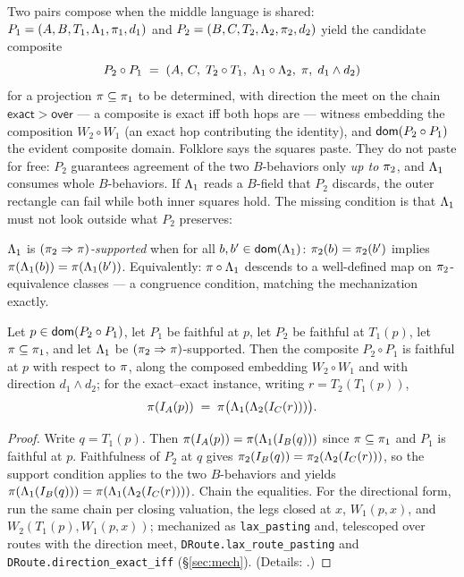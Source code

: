 Two pairs compose when the middle language is shared:
$P_1 = (A, B, T_1, \Lambda_1, \pi_1, d_1)$ and
$P_2 = (B, C, T_2, \Lambda_2, \pi_2, d_2)$ yield the candidate composite
\[
P_2 \circ P_1 \;=\; (A,\, C,\; T_2 \circ T_1,\; \Lambda_1 \circ \Lambda_2,\;
\pi,\; d_1 \wedge d_2)
\]
for a projection $\pi \subseteq \pi_1$ to be determined, with
direction the meet on the chain $\mathsf{exact} > \mathsf{over}$ --- a
composite is exact iff both hops are --- witness embedding the
composition $W_2 \circ W_1$ (an exact hop contributing the identity),
and $\mathsf{dom}(P_2 \circ P_1)$ the evident composite domain. Folklore says the
squares paste. They do not paste for free: $P_2$ guarantees agreement of
the two $B$-behaviors only \emph{up to} $\pi_2$, and $\Lambda_1$ consumes
whole $B$-behaviors. If $\Lambda_1$ reads a $B$-field that $P_2$ discards,
the outer rectangle can fail while both inner squares hold. The missing
condition is that $\Lambda_1$ must not look outside what $P_2$ preserves:

\begin{definition}[Support]
\label{def:support}
$\Lambda_1$ is \emph{$(\pi_2 \Rightarrow \pi)$-supported} when for all
$b, b' \in \mathsf{dom}(\Lambda_1)$:
$\pi_2(b) = \pi_2(b')$ implies
$\pi(\Lambda_1(b)) = \pi(\Lambda_1(b'))$.
Equivalently: $\pi \circ \Lambda_1$ descends to a well-defined map on
$\pi_2$-equivalence classes --- a congruence condition, matching the
mechanization exactly.
\end{definition}

\begin{theorem}[Pasting]
\label{thm:pasting}
Let $p \in \mathsf{dom}(P_2 \circ P_1)$, let $P_1$ be faithful at $p$, let $P_2$
be faithful at $T_1(p)$, let $\pi \subseteq \pi_1$, and let
$\Lambda_1$ be $(\pi_2 \Rightarrow \pi)$-supported. Then the
composite $P_2 \circ P_1$ is faithful at $p$ with respect to $\pi$,
along the composed embedding $W_2 \circ W_1$ and with direction
$d_1 \wedge d_2$; for the exact--exact instance, writing
$r = T_2(T_1(p))$,
\[
\pi(I_A(p)) \;=\; \pi\bigl(\Lambda_1(\Lambda_2(I_C(r)))\bigr).
\]
\end{theorem}

\begin{proof}
Write $q = T_1(p)$. Then $\pi(I_A(p)) = \pi(\Lambda_1(I_B(q)))$ since
$\pi \subseteq \pi_1$ and $P_1$ is faithful at $p$. Faithfulness of
$P_2$ at $q$ gives
$\pi_2(I_B(q)) = \pi_2(\Lambda_2(I_C(r)))$, so the
support condition applies to the two $B$-behaviors and yields
$\pi(\Lambda_1(I_B(q))) = \pi(\Lambda_1(\Lambda_2(I_C(r))))$.
Chain the equalities. For the directional form, run the same chain per
closing valuation, the legs closed at $x$, $W_1(p,x)$, and
$W_2(T_1(p), W_1(p,x))$; mechanized as \texttt{lax\_pasting} and,
telescoped over routes with the direction meet,
\texttt{DRoute.lax\_route\_pasting} and
\texttt{DRoute.direction\_exact\_iff} (\S\ref{sec:mech}).
(Details: .)
\end{proof}

